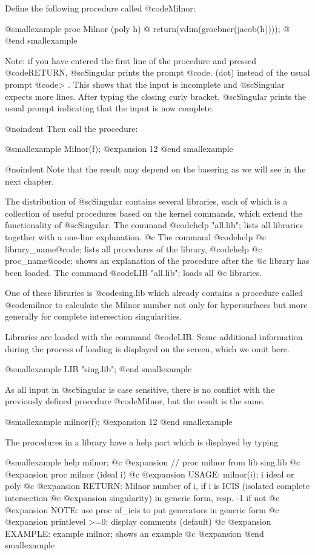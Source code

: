 Define the following procedure called @code{Milnor}:

@smallexample
proc Milnor (poly h)
@{
  return(vdim(groebner(jacob(h))));
@}
@end smallexample

Note: if you have entered the first line of the procedure and pressed
@code{RETURN}, @sc{Singular} prints the prompt @code{.} (dot) instead of
the usual prompt @code{>} . This shows that the input is incomplete and
@sc{Singular} expects more lines. After typing the closing curly
bracket, @sc{Singular} prints the usual prompt indicating that the input
is now complete.

@noindent Then call the procedure:

@smallexample
Milnor(f);
@expansion{} 12
@end smallexample

@noindent Note that the result may depend on the basering as we will
see in the next chapter.

The distribution of  @sc{Singular} contains  several libraries, each of
which is a collection of useful
procedures based on the kernel commands, which extend the functionality
of @sc{Singular}. The command @code{help "all.lib";} lists all libraries
together with a one-line explanation.
@c The command @code{help}
@c library_name@code{;} lists all procedures of the library, @code{help}
@c proc_name@code{;} shows an explanation of the procedure after the
@c library has been loaded. The command @code{LIB "all.lib";} loads all
@c libraries.

One of these libraries is @code{sing.lib} which already contains a
procedure called @code{milnor} to calculate the Milnor number not only
for hypersurfaces but more generally for complete intersection
singularities.

Libraries are loaded with the command @code{LIB}. Some additional
information during the process of loading is displayed on the screen,
which we omit here.

@smallexample
LIB "sing.lib";
@end smallexample

As all input in @sc{Singular} is case sensitive, there is no conflict with
the previously  defined procedure @code{Milnor}, but the result is the same.

@smallexample
milnor(f);
@expansion{} 12
@end smallexample

The procedures in a library have a help part
which is displayed by typing

@smallexample
help milnor;
@c @expansion{} // proc milnor from lib sing.lib
@c @expansion{} proc milnor (ideal i)
@c @expansion{} USAGE:   milnor(i); i ideal or poly
@c @expansion{} RETURN:  Milnor number of i, if i is ICIS (isolated complete intersection
@c @expansion{}          singularity) in generic form, resp. -1 if not
@c @expansion{} NOTE:    use proc nf_icis to put generators in generic form
@c @expansion{}          printlevel >=0: display comments (default)
@c @expansion{} EXAMPLE: example milnor; shows an example
@c @expansion{}
@end smallexample

